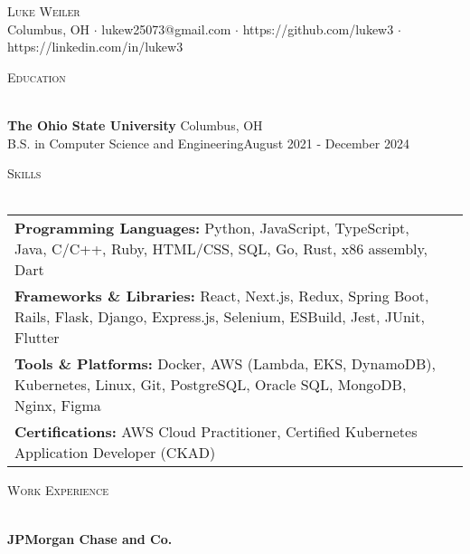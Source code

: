 \documentclass[letterpaper]{article}
\newcommand{\lineunder} {
    \vspace*{-8pt} \\
    \hspace*{-18pt} \hrulefill \\
}
\newcommand{\header} [1] {
    {\hspace*{-18pt}\vspace*{6pt} \textsc{#1}}
    \vspace*{-6pt} \lineunder
}
\begin{document}
\vspace*{-40pt}

\vspace*{-10pt}
\begin{center}
	{\Huge \scshape {Luke Weiler}}\\
	Columbus, OH $\cdot$ lukew25073@gmail.com $\cdot$ https://github.com/lukew3 $\cdot$ https://linkedin.com/in/lukew3\\
\end{center}

\header{Education}
\vspace{1mm}

    \textbf{The Ohio State University} \hfill Columbus, OH\\
    B.S. in Computer Science and Engineering\hfill \hfill August 2021 - December 2024\\
    \vspace{2mm}


\header{Skills}
\vspace{1.5mm}
\hspace{-3mm}
\begin{tabular}{ l l }

    \textbf{Programming Languages:} Python, JavaScript, TypeScript, Java, C/C++, Ruby, HTML/CSS, SQL, Go, Rust, x86 assembly, Dart \\

    \textbf{Frameworks \& Libraries:} React, Next.js, Redux, Spring Boot, Rails, Flask, Django, Express.js, Selenium, ESBuild, Jest, JUnit, Flutter  \\

    \textbf{Tools \& Platforms:} Docker, AWS (Lambda, EKS, DynamoDB), Kubernetes, Linux, Git, PostgreSQL, Oracle SQL, MongoDB, Nginx, Figma  \\

    \textbf{Certifications:} AWS Cloud Practitioner, Certified Kubernetes Application Developer (CKAD)  \\

\end{tabular}
\vspace{2mm}

\header{Work Experience}
\vspace{1mm}

    \textbf{JPMorgan Chase and Co.}\\
\end{document}
